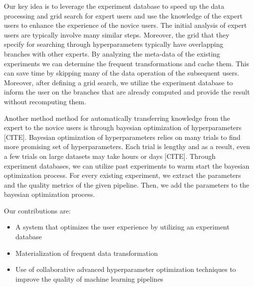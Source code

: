 Our key idea is to leverage the experiment database to speed up the data processing and grid search for expert users and use the knowledge of the expert users to enhance the experience of the novice users.
The initial analysis of expert users are typically involve many similar steps.
Moreover, the grid that they specify for searching through hyperparameters typically have overlapping branches with other experts.
By analyzing the meta-data of the existing experiments we can determine the frequent transformations and cache them.
This can save time by skipping many of the data operation of the subsequent users.
Moreover, after defining a grid search, we utilize the experiment database to inform the user on the branches that are already computed and provide the result without recomputing them.

Another method method for automatically transferring knowledge from the expert to the novice users is through bayesian optimization of hyperparameters [CITE].
Bayesian optimization of hyperparameters relies on many trials to find more promising set of hyperparameters. 
Each trial is lengthy and as a result, even a few trials on large datasets may take hours or days [CITE].
Through experiment databases, we can utilize past experiments to warm start the bayesian optimization process.
For every existing experiment, we extract the parameters and the quality metrics of the given pipeline.
Then, we add the parameters to the bayesian optimization process.

Our contributions are:
\begin{itemize}
\item A system that optimizes the user experience by utilizing an experiment database
\item Materialization of frequent data transformation
\item Use of collaborative advanced hyperparameter optimization techniques to improve the quality of machine learning pipelines
\end{itemize}